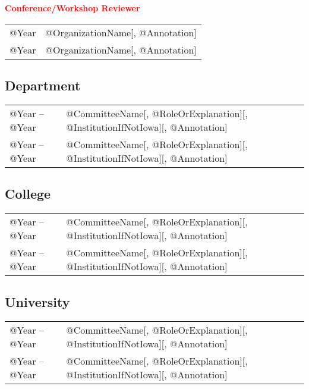 \documentclass[10pt]{article}
\renewcommand{\new}[1]{\textcolor{red}{#1}}
\begin{document}
\begin{itemize}
\begin{IOWA ONLY}
\item[] \textbf{\new{Conference/Workshop Reviewer}}
\\[1.3ex]
\begin{tabular}{l@{\quad\ }p{34em}} 
 @Year & @OrganizationName[, @Annotation]
 \\[.5ex]
 @Year & @OrganizationName[, @Annotation]
\end{tabular}
\end{IOWA ONLY}

\end{itemize}

\begin{IOWA ONLY}
\subsection*{Department}

\begin{tabular}{l@{\quad\ }p{34em}} 
 @Year -- @Year 
 & @CommitteeName[, @RoleOrExplanation][, @InstitutionIfNotIowa][, @Annotation]
 \\[.5ex]
 @Year -- @Year 
 & @CommitteeName[, @RoleOrExplanation][, @InstitutionIfNotIowa][, @Annotation]
\end{tabular}

\subsection*{College}

\begin{tabular}{l@{\quad\ }p{34em}} 
 @Year -- @Year 
 & @CommitteeName[, @RoleOrExplanation][, @InstitutionIfNotIowa][, @Annotation]
 \\[.5ex]
 @Year -- @Year 
 & @CommitteeName[, @RoleOrExplanation][, @InstitutionIfNotIowa][, @Annotation]
\end{tabular}

\subsection*{University}

\begin{tabular}{l@{\quad\ }p{34em}} 
 @Year -- @Year 
 & @CommitteeName[, @RoleOrExplanation][, @InstitutionIfNotIowa][, @Annotation]
 \\[.5ex]
 @Year -- @Year 
 & @CommitteeName[, @RoleOrExplanation][, @InstitutionIfNotIowa][, @Annotation]
\end{tabular}


\end{IOWA ONLY}
\end{document}

